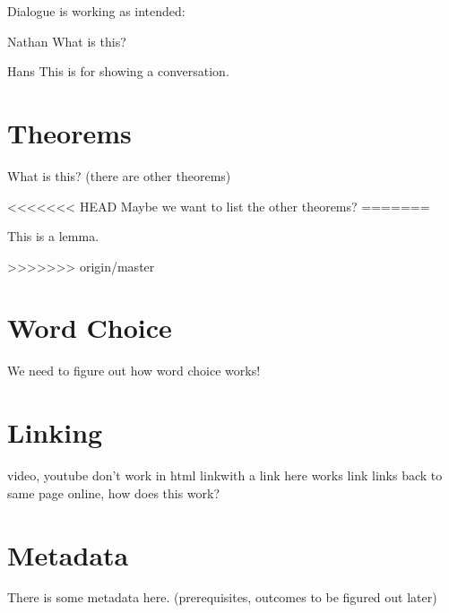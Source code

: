 \documentclass{ximera}
\begin{document}
Dialogue is working as intended:

\begin{dialogue}
\item[Nathan] What is this?
\item[Hans] This is for showing a conversation.
\end{dialogue}



\section{Theorems}

\begin{theorem}
What is this? (there are other theorems)
\end{theorem}

<<<<<<< HEAD
Maybe we want to list the other theorems?
=======
\begin{lemma}
This is a lemma.
\end{lemma}
>>>>>>> origin/master



\section{Word Choice}

We need to figure out how word choice works!



\section{Linking}

video, youtube don't work in html
link{with a link here} works
link{} links back to same page online, how does this work?

\link{} %



\section{Metadata}

There is some metadata here. (prerequisites, outcomes to be figured out later)

\end{document}
